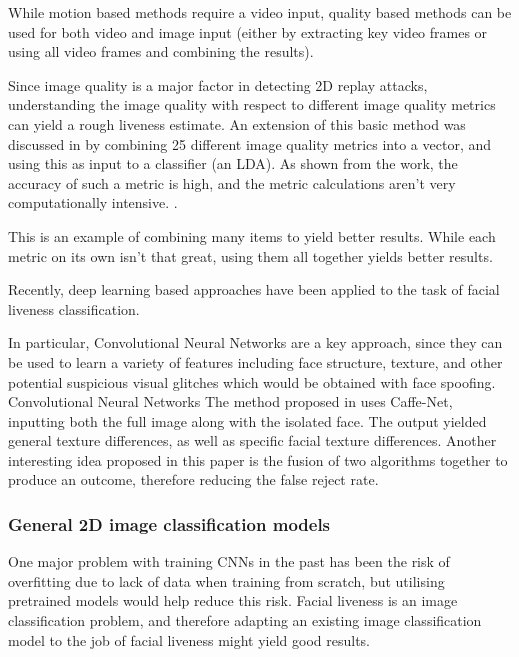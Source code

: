 \documentclass[11pt,a4paper]{article}
\begin{document}
        While motion based methods require a video input, quality based methods can be used for both video and image input (either by extracting key video frames or using all video frames and combining the results).

        Since image quality is a major factor in detecting 2D replay attacks, understanding the image quality with respect to different image quality metrics can yield a rough liveness estimate.
        An extension of this basic method was discussed in \cite{ImageQualityAssessmentTest} by combining 25 different image quality metrics into a vector, and using this as input to a classifier (an LDA).
        As shown from the work, the accuracy of such a metric is high, and the metric calculations aren't very computationally intensive. \cite{ImageQualityAssessmentTest}.
        
        This is an example of combining many items to yield better results. While each metric on its own isn't that great, using them all together yields better results.
        
        Recently, deep learning based approaches have been applied to the task of facial liveness classification.

        In particular, Convolutional Neural Networks are a key approach, since they can be used to learn a variety of features including face structure,
        texture, and other potential suspicious visual glitches which would be obtained with face spoofing. Convolutional Neural Networks 
        The method proposed in \cite{Patel2016CrossDatabaseFA} uses Caffe-Net, inputting both the full image along with the isolated face.
        The output yielded general texture differences, as well as specific facial texture differences. Another interesting idea proposed
        in this paper is the fusion of two algorithms together to produce an outcome, therefore reducing the false reject rate.
        
        \subsubsection{General 2D image classification models}
        One major problem with training CNNs in the past has been the risk of overfitting due to lack of data when training from scratch, but utilising pretrained models would help reduce this risk.
        Facial liveness is an image classification problem, and therefore adapting an existing image classification model to the job of facial liveness might yield good results. 
\end{document}

